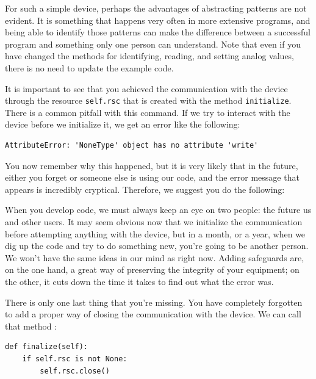 For such a simple device, perhaps the advantages of abstracting patterns are not evident. It is something that happens very often in more extensive programs, and being able to identify those patterns can make the difference between a successful program and something only one person can understand. Note that even if you have changed the methods for identifying, reading, and setting analog values, there is no need to update the example code.

It is important to see that you achieved the communication with the device through the resource \texttt{self.rsc} that is created with the method \texttt{initialize}. There is a common pitfall with this command. If we try to interact with the device before we initialize it, we get an error like the following:

\begin{verbatim}
AttributeError: 'NoneType' object has no attribute 'write'
\end{verbatim}

You now remember why this happened, but it is very likely that in the future, either you forget or someone else is using our code, and the error message that appears is incredibly cryptical. Therefore, we suggest you do the following:


When you develop code, we must always keep an eye on two people: the future us and other users. It may seem obvious now that we initialize the communication before attempting anything with the device, but in a month, or a year, when we dig up the code and try to do something new, you're going to be another person. We won't have the same ideas in our mind as right now. Adding safeguards are, on the one hand, a great way of preserving the integrity of your equipment; on the other, it cuts down the time it takes to find out what the error was.

There is only one last thing that you're missing. You have completely forgotten to add a proper way of closing the communication with the device. We can call that method :

\begin{verbatim}
def finalize(self):
    if self.rsc is not None:
        self.rsc.close()
\end{verbatim}


